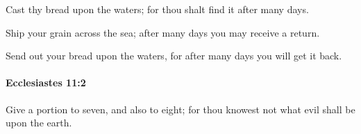 			\begin{versebox}
					\item[BHS] 
					\item[LXX] 
					\item[ASV] Cast thy bread upon the waters; for thou shalt find it after many days.
					\item[NIV] Ship your grain across the sea; after many days you may receive a return.
					\item[NRSV] Send out your bread upon the waters, for after many days you will get it back.
			\end{versebox}

		\paragraph{Ecclesiastes 11:2} %
			\label{ECCLESIASTES-11-2}

			Give a portion to seven, and also to eight; for thou knowest not what evil shall be upon the earth.

